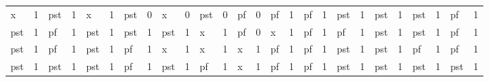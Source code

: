 \begin{table}[H]
\begin{center}
\begin{tabular}{llllllllllllllllllllllllll}
\rowcolor[HTML]{9AFF99} 
\cellcolor[HTML]{C0C0C0}x   & 1                         & \cellcolor[HTML]{FFCCC9}pst & 1                         & \cellcolor[HTML]{C0C0C0}x   & 1                         & \cellcolor[HTML]{FFCCC9}pst & \cellcolor[HTML]{C0C0C0}0 & \cellcolor[HTML]{C0C0C0}x   & \cellcolor[HTML]{C0C0C0}0 & \cellcolor[HTML]{FFCCC9}pst & \cellcolor[HTML]{C0C0C0}0 & pf                          & \cellcolor[HTML]{C0C0C0}0 & pf                         & 1                         & pf                          & 1                         & \cellcolor[HTML]{FFCCC9}pst & 1                         & \cellcolor[HTML]{FFCCC9}pst & 1                         & \cellcolor[HTML]{FFCCC9}pst & 1                         & pf                          & 1                         \\
\rowcolor[HTML]{9AFF99} 
\cellcolor[HTML]{FFCCC9}pst & 1                         & pf                          & 1                         & \cellcolor[HTML]{FFCCC9}pst & 1                         & \cellcolor[HTML]{FFCCC9}pst & 1                         & \cellcolor[HTML]{FFCCC9}pst & 1                         & \cellcolor[HTML]{C0C0C0}x   & 1                         & pf                          & \cellcolor[HTML]{C0C0C0}0 & \cellcolor[HTML]{C0C0C0}x  & 1                         & pf                          & 1                         & pf                          & 1                         & \cellcolor[HTML]{FFCCC9}pst & 1                         & \cellcolor[HTML]{FFCCC9}pst & 1                         & pf                          & 1                         \\
\rowcolor[HTML]{9AFF99} 
\cellcolor[HTML]{FFCCC9}pst & 1                         & pf                          & 1                         & \cellcolor[HTML]{FFCCC9}pst & 1                         & pf                          & 1                         & \cellcolor[HTML]{C0C0C0}x   & 1                         & \cellcolor[HTML]{C0C0C0}x   & 1                         & \cellcolor[HTML]{C0C0C0}x   & 1                         & pf                         & 1                         & pf                          & 1                         & \cellcolor[HTML]{FFCCC9}pst & 1                         & \cellcolor[HTML]{FFCCC9}pst & 1                         & pf                          & 1                         & pf                          & 1                         \\
\rowcolor[HTML]{9AFF99} 
\cellcolor[HTML]{FFCCC9}pst & 1                         & \cellcolor[HTML]{FFCCC9}pst & 1                         & \cellcolor[HTML]{FFCCC9}pst & 1                         & pf                          & 1                         & \cellcolor[HTML]{FFCCC9}pst & 1                         & pf                          & 1                         & \cellcolor[HTML]{C0C0C0}x   & 1                         & pf                         & 1                         & pf                          & 1                         & \cellcolor[HTML]{FFCCC9}pst & 1                         & \cellcolor[HTML]{FFCCC9}pst & 1                         & \cellcolor[HTML]{FFCCC9}pst & 1                         & \cellcolor[HTML]{FFCCC9}pst & 1                         \\

\end{tabular}
\end{center}
\end{table}
